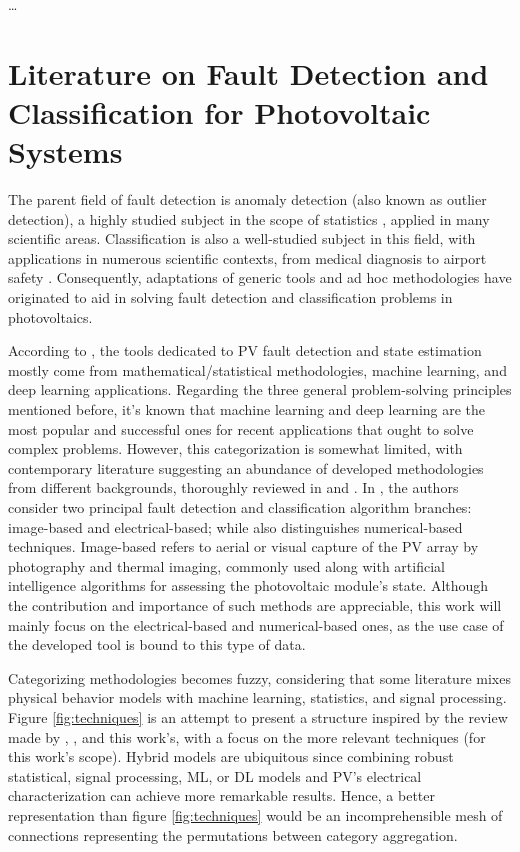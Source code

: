 \dots

\section{Literature on Fault Detection and Classification for Photovoltaic Systems}

The parent field of fault detection is anomaly detection (also known as outlier detection), a highly studied subject in the scope of statistics \cite{Prasad2009}, applied in many scientific areas. Classification is also a well-studied subject in this field, with applications in numerous scientific contexts, from medical diagnosis to airport safety \cite{classification}. Consequently, adaptations of generic tools and ad hoc methodologies have originated to aid in solving fault detection and classification problems in photovoltaics.

According to \cite{AIPV}, the tools dedicated to PV fault detection and state estimation mostly come from mathematical/statistical methodologies, machine learning, and deep learning applications. Regarding the three general problem-solving principles mentioned before, it's known that machine learning and deep learning are the most popular and successful ones for recent applications that ought to solve complex problems. However, this categorization is somewhat limited, with contemporary literature suggesting an abundance of developed methodologies from different backgrounds, thoroughly reviewed in \cite{Hong2022} and \cite{Livera2019}. In \cite{Hong2022}, the authors consider two principal fault detection and classification algorithm branches: image-based and electrical-based; while \cite{Livera2019} also distinguishes numerical-based techniques. Image-based refers to aerial or visual capture of the PV array by photography and thermal imaging, commonly used along with artificial intelligence algorithms for assessing the photovoltaic module's state. Although the contribution and importance of such methods are appreciable, this work will mainly focus on the electrical-based and numerical-based ones, as the use case of the developed tool is bound to this type of data.

Categorizing methodologies becomes fuzzy, considering that some literature mixes physical behavior models with machine learning, statistics, and signal processing. Figure \ref{fig:techniques} is an attempt to present a structure inspired by the review made by \cite{Hong2022}, \cite{Livera2019}, and this work's, with a focus on the more relevant techniques (for this work's scope). Hybrid models are ubiquitous since combining robust statistical, signal processing, ML, or DL models and PV's electrical characterization can achieve more remarkable results. Hence, a better representation than figure \ref{fig:techniques} would be an incomprehensible mesh of connections representing the permutations between category aggregation.
 
